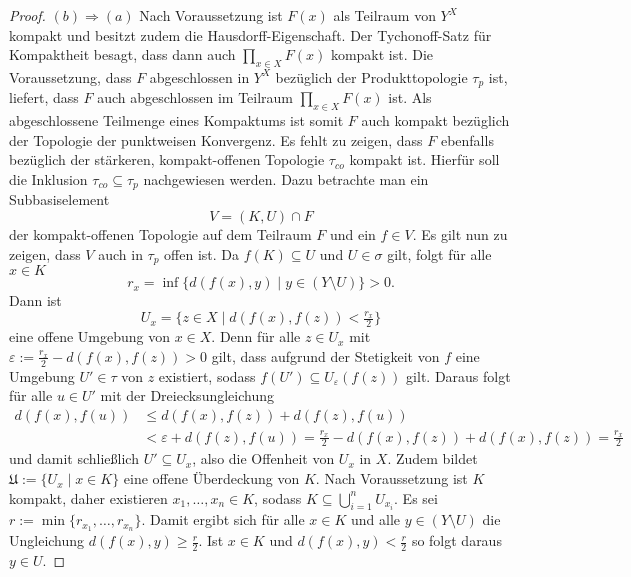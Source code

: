 \begin{proof}
  $(b) \Rightarrow (a)$
  Nach Voraussetzung ist $F(x)$ als Teilraum von $Y^X$ kompakt und besitzt zudem die Hausdorff-Eigenschaft.
  Der Tychonoff-Satz für Kompaktheit besagt, dass dann auch $\prod_{x \in X} F(x)$ kompakt ist.
  Die Voraussetzung, dass $F$ abgeschlossen in $Y^X$ bezüglich der Produkttopologie $\tau_p$ ist, liefert, dass $F$ auch abgeschlossen im Teilraum $\prod_{x \in X} F(x)$ ist.
  Als abgeschlossene Teilmenge eines Kompaktums ist somit $F$ auch kompakt bezüglich der Topologie der punktweisen Konvergenz.
  Es fehlt zu zeigen, dass $F$ ebenfalls bezüglich der stärkeren, kompakt-offenen Topologie $\tau_{co}$ kompakt ist.
  Hierfür soll die Inklusion $\tau_{co} \subseteq \tau_p$ nachgewiesen werden.
  Dazu betrachte man ein Subbasiselement 
  \begin{displaymath}
    V = (K,U) \cap F
  \end{displaymath}
  der kompakt-offenen Topologie auf dem Teilraum $F$ und ein $f \in V$.
  Es gilt nun zu zeigen, dass $V$ auch in $\tau_p$ offen ist.
  Da $f(K) \subseteq U$ und $U \in \sigma$ gilt, folgt für alle $x \in K$
  \begin{displaymath}
    r_x = \inf\{d(f(x),y) \mid y \in (Y \setminus U) \} > 0.
  \end{displaymath}
  Dann ist 
  \begin{displaymath}
    U_x = \{ z \in X \mid d(f(x),f(z)) < \tfrac{r_x}{2}\}
  \end{displaymath} 
  eine offene Umgebung von $x \in X$.
  Denn für alle $z \in U_x$ mit $\varepsilon := \tfrac{r_x}{2} - d(f(x),f(z)) > 0$ gilt, dass aufgrund der Stetigkeit von $f$ eine Umgebung $U' \in \tau$ von $z$ existiert, sodass $f(U') \subseteq U_\varepsilon(f(z))$ gilt.
  Daraus folgt für alle $u \in U'$ mit der Dreiecksungleichung
  \begin{align*}
    d(f(x),f(u)) &\leq d(f(x),f(z)) + d(f(z),f(u)) \\
                 &< \varepsilon + d(f(z),f(u)) = \frac{r_x}{2} - d(f(x),f(z)) + d(f(x),f(z)) =  \frac{r_x}{2}
  \end{align*}
  und damit schließlich $U' \subseteq U_x$, also die Offenheit von $U_x$ in $X$.
  Zudem bildet $\mathfrak{U} := \{U_x \mid x \in K\}$ eine offene Überdeckung von $K$. 
  Nach Voraussetzung ist $K$ kompakt, daher existieren $x_1,\dots,x_n \in K$, sodass $K \subseteq \bigcup_{i=1}^n U_{x_i}$.
  Es sei $r:= \min\{r_{x_1},\dots,r_{x_n}\}$. 
  Damit ergibt sich für alle $x \in K$ und alle $y \in (Y \setminus U)$ die Ungleichung $d(f(x),y) \geq \tfrac{r}{2}$.
  Ist $x \in K$ und $d(f(x),y) < \tfrac{r}{2}$ so folgt daraus $y \in U$.

\end{proof}
